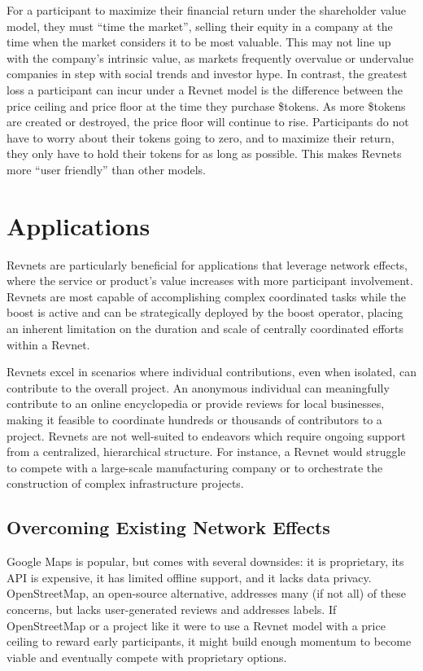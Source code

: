 \documentclass{article}
\begin{document}
For a participant to maximize their financial return under the shareholder value model, they must ``time the market'', selling their equity in a company at the time when the market considers it to be most valuable. This may not line up with the company's intrinsic value, as markets frequently overvalue or undervalue companies in step with social trends and investor hype. In contrast, the greatest loss a participant can incur under a Revnet model is the difference between the price ceiling and price floor at the time they purchase \$tokens. As more \$tokens are created or destroyed, the price floor will continue to rise. Participants do not have to worry about their tokens going to zero, and to maximize their return, they only have to hold their tokens for as long as possible. This makes Revnets more ``user friendly'' than other models.

\section{Applications}

Revnets are particularly beneficial for applications that leverage network effects, where the service or product's value increases with more participant involvement. Revnets are most capable of accomplishing complex coordinated tasks while the boost is active and can be strategically deployed by the boost operator, placing an inherent limitation on the duration and scale of centrally coordinated efforts within a Revnet.

Revnets excel in scenarios where individual contributions, even when isolated, can contribute to the overall project. An anonymous individual can meaningfully contribute to an online encyclopedia or provide reviews for local businesses, making it feasible to coordinate hundreds or thousands of contributors to a project. Revnets are not well-suited to endeavors which require ongoing support from a centralized, hierarchical structure. For instance, a Revnet would struggle to compete with a large-scale manufacturing company or to orchestrate the construction of complex infrastructure projects.

\subsection{Overcoming Existing Network Effects}

Google Maps is popular, but comes with several downsides: it is proprietary, its API is expensive, it has limited offline support, and it lacks data privacy. OpenStreetMap, an open-source alternative, addresses many (if not all) of these concerns, but lacks user-generated reviews and addresses labels. If OpenStreetMap or a project like it were to use a Revnet model with a price ceiling to reward early participants, it might build enough momentum to become viable and eventually compete with proprietary options.
\end{document}
